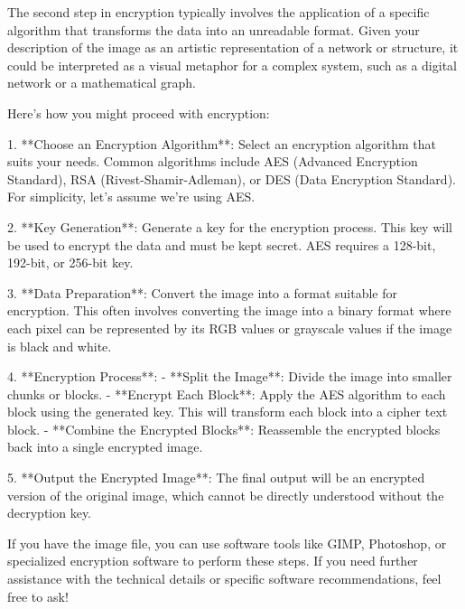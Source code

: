 The second step in encryption typically involves the application of a specific algorithm that transforms the data into an unreadable format. Given your description of the image as an artistic representation of a network or structure, it could be interpreted as a visual metaphor for a complex system, such as a digital network or a mathematical graph.

Here’s how you might proceed with encryption:

1. **Choose an Encryption Algorithm**: Select an encryption algorithm that suits your needs. Common algorithms include AES (Advanced Encryption Standard), RSA (Rivest-Shamir-Adleman), or DES (Data Encryption Standard). For simplicity, let's assume we're using AES.

2. **Key Generation**: Generate a key for the encryption process. This key will be used to encrypt the data and must be kept secret. AES requires a 128-bit, 192-bit, or 256-bit key.

3. **Data Preparation**: Convert the image into a format suitable for encryption. This often involves converting the image into a binary format where each pixel can be represented by its RGB values or grayscale values if the image is black and white.

4. **Encryption Process**:
   - **Split the Image**: Divide the image into smaller chunks or blocks.
   - **Encrypt Each Block**: Apply the AES algorithm to each block using the generated key. This will transform each block into a cipher text block.
   - **Combine the Encrypted Blocks**: Reassemble the encrypted blocks back into a single encrypted image.

5. **Output the Encrypted Image**: The final output will be an encrypted version of the original image, which cannot be directly understood without the decryption key.

If you have the image file, you can use software tools like GIMP, Photoshop, or specialized encryption software to perform these steps. If you need further assistance with the technical details or specific software recommendations, feel free to ask!